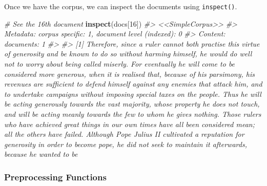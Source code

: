 \documentclass[
]{book}
\newenvironment{Shaded}{\begin{snugshade}}{\end{snugshade}}
\newcommand{\CommentTok}[1]{\textcolor[rgb]{0.56,0.35,0.01}{\textit{#1}}}
\newcommand{\DataTypeTok}[1]{\textcolor[rgb]{0.13,0.29,0.53}{#1}}
\newcommand{\DecValTok}[1]{\textcolor[rgb]{0.00,0.00,0.81}{#1}}
\newcommand{\KeywordTok}[1]{\textcolor[rgb]{0.13,0.29,0.53}{\textbf{#1}}}
\newcommand{\NormalTok}[1]{#1}
\newcommand{\OperatorTok}[1]{\textcolor[rgb]{0.81,0.36,0.00}{\textbf{#1}}}
\newcommand{\OtherTok}[1]{\textcolor[rgb]{0.56,0.35,0.01}{#1}}
\newcommand{\StringTok}[1]{\textcolor[rgb]{0.31,0.60,0.02}{#1}}
\begin{document}
\begin{Shaded}
\end{Shaded}

Once we have the corpus, we can inspect the documents using \texttt{inspect()}.

\begin{Shaded}
\begin{Highlighting}[]
\CommentTok{# See the 16th document}
\KeywordTok{inspect}\NormalTok{(docs[}\DecValTok{16}\NormalTok{])}
\CommentTok{#> <<SimpleCorpus>>}
\CommentTok{#> Metadata:  corpus specific: 1, document level (indexed): 0}
\CommentTok{#> Content:  documents: 1}
\CommentTok{#> }
\CommentTok{#> [1]  Therefore, since a ruler cannot both practise this virtue of generosity and be known to do so without harming himself, he would do well not to worry about being called miserly. For eventually he will come to be considered more generous, when it is realised that, because of his parsimony, his revenues are sufficient to defend himself against any enemies that attack him, and to undertake campaigns without imposing special taxes on the people. Thus he will be acting generously towards the vast majority, whose property he does not touch, and will be acting meanly towards the few to whom he gives nothing.  Those rulers who have achieved great things in our own times have all been considered mean; all the others have failed. Although Pope Julius II cultivated a reputation for generosity in order to become pope, he did not seek to maintain it afterwards, because he wanted to be}
\end{Highlighting}
\end{Shaded}

\hypertarget{preprocessing-functions}{%
\subsubsection*{Preprocessing Functions}\label{preprocessing-functions}}
\end{document}
